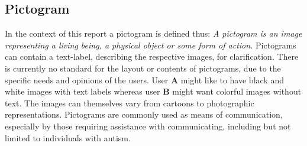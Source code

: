 \subsection{Pictogram}
\label{sub:pictogram}
In the context of this report a pictogram is defined thus:
\emph{A pictogram is an image representing a living being, a physical object or some form of action.}
Pictograms can contain a text-label, describing the respective images, for clarification. There is currently no standard for the layout or contents of pictograms, due to the specific needs and opinions of the users. User \textbf{A} might like to have black and white images with text labels whereas user \textbf{B} might want colorful images without text. The images can themselves vary from cartoons to photographic representations.
Pictograms are commonly used as means of communication, especially by those requiring assistance with communicating, including but not limited to individuals with autism.

